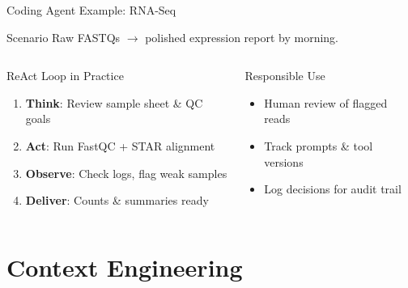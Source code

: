 \documentclass[aspectratio=169]{beamer}
\begin{document}
\begin{frame}{Coding Agent Example: RNA-Seq}
  \begin{block}{Scenario}
    Raw FASTQs $\rightarrow$ polished expression report by morning.
  \end{block}

  \vspace{0.5cm}

  \begin{columns}[T]
    \begin{column}{0.48\textwidth}
      \small
      \textcolor{conesaTeal}{ReAct Loop in Practice}

      \vspace{0.2cm}

      \begin{enumerate}
        \item \textbf{Think}: Review sample sheet \& QC goals
        \item \textbf{Act}: Run FastQC + STAR alignment
        \item \textbf{Observe}: Check logs, flag weak samples
        \item \textbf{Deliver}: Counts \& summaries ready
      \end{enumerate}
    \end{column}
    \begin{column}{0.48\textwidth}
      \small
      \textcolor{conesaOrange}{Responsible Use}

      \vspace{0.2cm}

      \begin{itemize}
        \item Human review of flagged reads
        \item Track prompts \& tool versions
        \item Log decisions for audit trail
      \end{itemize}
    \end{column}
  \end{columns}
\end{frame}

\section{Context Engineering}
\end{document}
